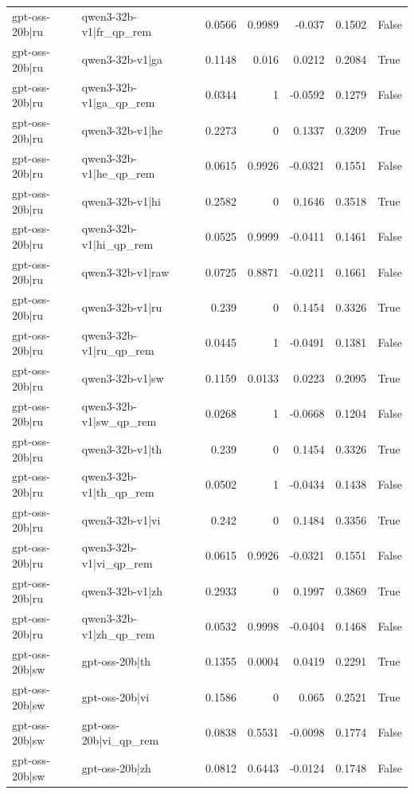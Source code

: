 \begin{table}
\begin{tabular}{l l r r r r l}
gpt-oss-20b|ru & qwen3-32b-v1|fr_qp_rem & 0.0566 & 0.9989 & -0.037 & 0.1502 & False \\
gpt-oss-20b|ru & qwen3-32b-v1|ga & 0.1148 & 0.016 & 0.0212 & 0.2084 & True \\
gpt-oss-20b|ru & qwen3-32b-v1|ga_qp_rem & 0.0344 & 1 & -0.0592 & 0.1279 & False \\
gpt-oss-20b|ru & qwen3-32b-v1|he & 0.2273 & 0 & 0.1337 & 0.3209 & True \\
gpt-oss-20b|ru & qwen3-32b-v1|he_qp_rem & 0.0615 & 0.9926 & -0.0321 & 0.1551 & False \\
gpt-oss-20b|ru & qwen3-32b-v1|hi & 0.2582 & 0 & 0.1646 & 0.3518 & True \\
gpt-oss-20b|ru & qwen3-32b-v1|hi_qp_rem & 0.0525 & 0.9999 & -0.0411 & 0.1461 & False \\
gpt-oss-20b|ru & qwen3-32b-v1|raw & 0.0725 & 0.8871 & -0.0211 & 0.1661 & False \\
gpt-oss-20b|ru & qwen3-32b-v1|ru & 0.239 & 0 & 0.1454 & 0.3326 & True \\
gpt-oss-20b|ru & qwen3-32b-v1|ru_qp_rem & 0.0445 & 1 & -0.0491 & 0.1381 & False \\
gpt-oss-20b|ru & qwen3-32b-v1|sw & 0.1159 & 0.0133 & 0.0223 & 0.2095 & True \\
gpt-oss-20b|ru & qwen3-32b-v1|sw_qp_rem & 0.0268 & 1 & -0.0668 & 0.1204 & False \\
gpt-oss-20b|ru & qwen3-32b-v1|th & 0.239 & 0 & 0.1454 & 0.3326 & True \\
gpt-oss-20b|ru & qwen3-32b-v1|th_qp_rem & 0.0502 & 1 & -0.0434 & 0.1438 & False \\
gpt-oss-20b|ru & qwen3-32b-v1|vi & 0.242 & 0 & 0.1484 & 0.3356 & True \\
gpt-oss-20b|ru & qwen3-32b-v1|vi_qp_rem & 0.0615 & 0.9926 & -0.0321 & 0.1551 & False \\
gpt-oss-20b|ru & qwen3-32b-v1|zh & 0.2933 & 0 & 0.1997 & 0.3869 & True \\
gpt-oss-20b|ru & qwen3-32b-v1|zh_qp_rem & 0.0532 & 0.9998 & -0.0404 & 0.1468 & False \\
gpt-oss-20b|sw & gpt-oss-20b|th & 0.1355 & 0.0004 & 0.0419 & 0.2291 & True \\
gpt-oss-20b|sw & gpt-oss-20b|vi & 0.1586 & 0 & 0.065 & 0.2521 & True \\
gpt-oss-20b|sw & gpt-oss-20b|vi_qp_rem & 0.0838 & 0.5531 & -0.0098 & 0.1774 & False \\
gpt-oss-20b|sw & gpt-oss-20b|zh & 0.0812 & 0.6443 & -0.0124 & 0.1748 & False \\

\end{tabular}
\end{table}
